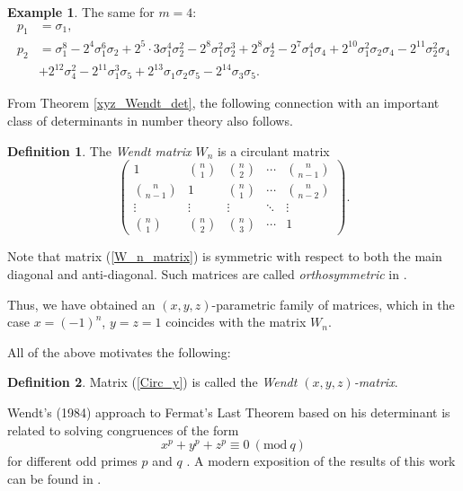 \documentclass[14pt, dvipsnames]{extarticle}
\theoremstyle{definition}
\theoremstyle{definition}
\newtheorem{defi}{Definition}
\newtheorem{example}{\bf Example}
\theoremstyle{remark}
\begin{document}
\begin{example}
The same for $m = 4$:
\begin{align*} 
p_1 &= \sigma_1, \\ 
p_2 &= \sigma_1^8 - 2^4 \sigma_1^6 \sigma_2 + 2^5 \cdot 3 \sigma_1^4 \sigma_2^2 
- 2^8 \sigma_1^2 \sigma_2^3 + 2^8 \sigma_2^4 
- 2^7 \sigma_1^4 \sigma_4 + 2^{10} \sigma_1^2 \sigma_2 \sigma_4 
- 2^{11} \sigma_2^2 \sigma_4 \\ &+ 2^{12} \sigma_4^2 
- 2^{11} \sigma_1^3 \sigma_5 + 2^{13} \sigma_1 \sigma_2 \sigma_5 
- 2^{14} \sigma_3 \sigma_5. 
\end{align*} 
\end{example}


From Theorem \ref{xyz_Wendt_det}, the following connection with an important class of determinants in number theory also follows.

\begin{defi}
The {\it Wendt matrix $W_n$} is a circulant matrix
\begin{equation}\label{W_n_matrix} 
\left(\begin{array}{ccccc}
1 & \binom{n}{1} & \binom{n}{2} & \cdots & \binom{n}{n-1}\\
\binom{n}{n-1} & 1 & \binom{n}{1} & \cdots & \binom{n}{n-2}\\
\vdots & \vdots & \vdots & \ddots & \vdots\\
\binom{n}{1} & \binom{n}{2} & \binom{n}{3} & \cdots & 1
\end{array}\right). 
\end{equation}
\end{defi}

Note that matrix (\ref{W_n_matrix}) is symmetric with respect to both the main diagonal and anti-diagonal. Such matrices are called {\it orthosymmetric} in \cite{Wendt}.

Thus, we have obtained an $(x, y, z)$-parametric family of matrices, which in the case $x = (-1)^n$, $y = z = 1$ coincides with the matrix $W_n$. 

All of the above motivates the following:

\begin{defi}
 Matrix (\ref{Circ_y}) is called the {\it Wendt $(x, y, z)$-matrix}.
\end{defi}

Wendt's (1984) approach to Fermat's Last Theorem based on his determinant is related to solving congruences of the form 
$$x^p + y^p + z^p \equiv 0\  (\mathrm{mod} \ q)$$
for different odd primes $p$ and $q$ \cite{Wendt}. A modern exposition of the results of this work can be found in \cite{Fermat_for_amateurs}.
\end{document}
